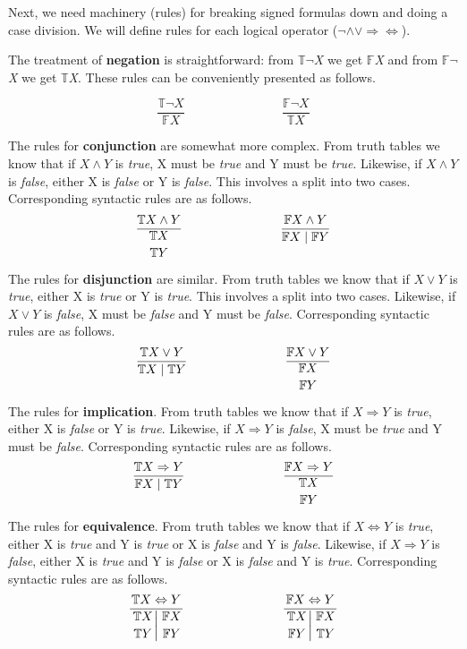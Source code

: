 \documentclass{article}
\newcommand\ST{\mathbb{T}}
\newcommand\SF{\mathbb{F}}
\begin{document}
	\par
	Next, we need machinery (rules) for breaking signed formulas down and doing a case division. We will define rules for each logical operator ($\neg \land \lor \Rightarrow \Leftrightarrow$).

	\par
	The treatment of \textbf{negation} is straightforward: from \textit{$\ST\neg$X} we get \textit{$\SF$X} and from \textit{$\SF\neg$X} we get \textit{$\ST$X}. These rules can be conveniently presented as follows.

	\[
		\frac{\ST \neg X}{\SF X}\;\;\;\;\;\;\;\;\;\;\;\;\;\;\;\;\;\;\;\;\;\;\;\;\;\;\;\ \frac{\SF \neg X}{\ST X}
	\]

	\par
	The rules for \textbf{conjunction} are somewhat more complex. From truth tables we know that if $X \land Y$ is \textit{true}, X must be \textit{true} and Y must be \textit{true}. Likewise, if $X \land Y$ is \textit{false}, either X is \textit{false} or Y is \textit{false}. This involves a split into two cases. Corresponding syntactic rules are as follows.
	\[
		\frac{\ST X \land Y}{\displaystyle{\ST X \atop \ST Y}}\;\;\;\;\;\;\;\;\;\;\;\;\;\;\;\;\;\;\;\;\;\;\;\;\;\;\;\ \frac{\SF X \land Y}{\SF X \mid \SF Y}
	\]

	The rules for \textbf{disjunction} are similar. From truth tables we know that if $X \lor Y$ is \textit{true}, either X is \textit{true} or Y is \textit{true}. This involves a split into two cases. Likewise, if $X \lor Y$ is \textit{false}, X must be \textit{false} and Y must be \textit{false}. Corresponding syntactic rules are as follows.
	\[
		\frac{\ST X \lor Y}{\ST X \mid \ST Y}\;\;\;\;\;\;\;\;\;\;\;\;\;\;\;\;\;\;\;\;\;\;\;\;\;\;\;\ \frac{\SF X \lor Y}{\displaystyle{\SF X \atop \SF Y}}
	\]

	\par
	The rules for \textbf{implication}. From truth tables we know that if $X \Rightarrow Y$ is \textit{true}, either X is \textit{false} or Y is \textit{true}. Likewise, if $X \Rightarrow Y$ is \textit{false}, X must be \textit{true} and Y must be \textit{false}. Corresponding syntactic rules are as follows.
	\[
		\frac{\ST X \Rightarrow Y}{\SF X \mid \ST Y}\;\;\;\;\;\;\;\;\;\;\;\;\;\;\;\;\;\;\;\;\;\;\;\;\;\;\;\ \frac{\SF X \Rightarrow Y}{\displaystyle{\ST X \atop \SF Y}}
	\]

	\par
	The rules for \textbf{equivalence}. From truth tables we know that if $X \Leftrightarrow Y$ is \textit{true}, either X is \textit{true} and Y is \textit{true} or X is \textit{false} and Y is \textit{false}. Likewise, if $X \Rightarrow Y$ is \textit{false}, either X is \textit{true} and Y is \textit{false} or X is \textit{false} and Y is \textit{true}. Corresponding syntactic rules are as follows.
	\[
		\frac{\ST X \Leftrightarrow Y}{\left.\displaystyle{\ST X \atop \ST Y}\right\vert\displaystyle{\SF X \atop \SF Y}}\;\;\;\;\;\;\;\;\;\;\;\;\;\;\;\;\;\;\;\;\;\;\;\;\;\;\;\ \frac{\SF X \Leftrightarrow Y}{\left.\displaystyle{\ST X \atop \SF Y}\right\vert\displaystyle{\SF X \atop \ST Y}}
	\]
\end{document}
